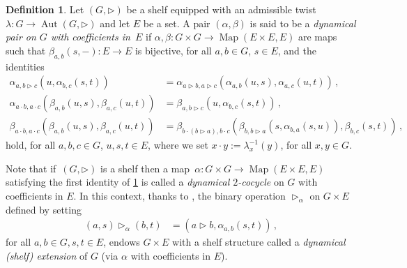 \documentclass[preprint,1p]{elsarticle}
\numberwithin{equation}{section}
\theoremstyle{definition}               %
\newtheorem{defin}[theor]{Definition}
\newcommand{\tr}{\triangleright}
\DeclareMathOperator{\Aut}{Aut}
\DeclareMathOperator{\Map}{Map}
\begin{document}
\medskip

\begin{defin}\label{def:dynamical-pair}
    Let $(G,\tr)$ be a shelf equipped with an admissible twist $\lambda:G \to \Aut(G,\tr)$ and let $E$ be a set.
    A pair $\left(\alpha,\beta\right)$ is said to be a \emph{dynamical pair on $G$ with coefficients in~$E$} if $\alpha,\beta: G\times G \to \Map(E \times E, E)$ are maps such that $\beta_{a,b}(s,{-}):E \to E$ is bijective, for all $a,b \in G$, $s \in E$, and the identities
        \begin{align*}
            \alpha_{a,b \tr c}
            \left( u,\alpha_{b,c}(s,t) \right) 
            &=
            \alpha_{a \tr b,a \tr c}
            \left( \alpha_{a,b}(u,s),\alpha_{a,c}(u,t) \right) 
            \,,\\[0.2cm]
            \alpha_{a \cdot b, a \cdot c}
            \left( \beta_{a,b}(u,s), \beta_{a,c}(u,t) \right)
            &=
            \beta_{a,b \tr c}
            \left( u, \alpha_{b,c}(s,t) \right)
            \,,\\[0.2cm]
            \beta_{a \cdot b, a \cdot c}
            \left( \beta_{a,b}(u,s), \beta_{a,c}(u,t) \right)
            &=
            \beta_{b \cdot (b \tr a), b \cdot c}
            \left( \beta_{b,b \tr a}(s,\alpha_{b,a}(s,u)), \beta_{b,c}(s,t) \right) \,,
        \end{align*}
        hold, for all $a,b,c \in G$, $u,s,t \in E$, where we set $x \cdot y := \lambda^{-1}_x(y)$, for all $x,y \in G$.
\end{defin}

Note that if~$(G,\tr)$ is a shelf then a map~$\alpha:G \times G \to \Map(E \times E,E)$ satisfying the first identity of \cref{def:dynamical-pair} is called a \emph{dynamical $2$-cocycle} on $G$ with coefficients in $E$.
In this context, thanks to \cite[Lemma~2.1]{AndGr03}, the binary operation $\tr_\alpha$ on $G \times E$ defined by setting 
\begin{align}\label{eq:dynamical_shelf}
    (a,s) \tr_\alpha (b,t) &= (a \tr b, \alpha_{a,b}(s,t)) \,,
\end{align}
for all $a,b \in G, s,t \in E$, endows $G \times E$ with a shelf structure called a \emph{dynamical (shelf) extension} of $G$ (via $\alpha$ with coefficients in $E$).
\end{document}
